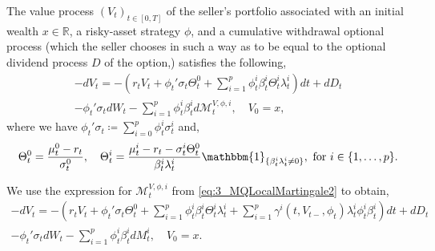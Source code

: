 \documentclass[11pt,a4paper]{article}
\numberwithin{equation}{section}
\theoremstyle{newPlain}
\theoremstyle{newDefinition}
\theoremstyle{newRemark}
\begin{document}
The value process $(V_t)_{t\in[0,T]}$ of the seller's portfolio associated with an initial wealth $x\in\mathbb{R}$, a risky-asset strategy $\phi$, and a cumulative withdrawal optional process  (which  the seller chooses in such a way as to be equal to the optional dividend process $D$ of the option,) satisfies the following,
\begin{multline}\label{eq:3_ValueProcess4}
    -dV_t = -\left(r_tV_t + \phi_t'\sigma_t\Theta_t^0 + \sum_{i=1}^p\phi_t^i\beta_t^i\Theta_t^i\lambda_t^i\right)dt + dD_t \\- \phi_t'\sigma_tdW_t - \sum_{i=1}^p\phi_t^i\beta_t^id\mathscr{M}_t^{V,\phi,i},\quad V_0=x,
\end{multline}
where we have $\phi_t'\sigma_t \coloneqq\sum_{i=0}^p\phi_t^i\sigma_t^i$ and,
\begin{equation*}
    \Theta_t^0=\frac{\mu_t^0-r_t}{\sigma_t^0},\quad\Theta_t^i=\frac{\mu_t^i-r_t-\sigma_t^i\Theta_t^0}{\beta_t^i\lambda_t^i}\mathbbm{1}_{\{\beta_t^i\lambda_t^i\ne0\}},\text{ for }i\in\{1,\ldots,p\}.
\end{equation*}

We  use the expression for $\mathscr{M}_t^{V,\phi,i}$ from \eqref{eq:3_MQLocalMartingale2} to obtain, 
\begin{multline}\label{eq:3_ValueProcess5}
    -dV_t = -\left(r_tV_t + \phi_t'\sigma_t\Theta_t^0 + \sum_{i=1}^p\phi_t^i\beta_t^i\Theta_t^i\lambda_t^i + \sum_{i=1}^p\gamma^i(t,V_{t-},\phi_t)\lambda_t^i\phi_t^i\beta_t^i\right)dt + dD_t \\- \phi_t'\sigma_tdW_t - \sum_{i=1}^p\phi_t^i\beta_t^idM_t^i,\quad V_0=x.
\end{multline}
\end{document}
